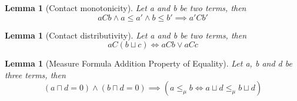 \documentclass{article}
\newtheorem{lemma}[theorem]{Lemma}
\begin{document}
\begin{lemma}[Contact monotonicity]
	Let a and b be two terms, then
	\begin{equation*}
		aCb \land a \leq a' \land b \le b' \implies a'Cb'
	\end{equation*}
\end{lemma}

\begin{lemma}[Contact distributivity]
	Let a and b be two terms, then
	\begin{equation*}
		aC(b \sqcup c) \iff aCb \lor aCc
	\end{equation*}
\end{lemma}

\begin{lemma}[Measure Formula Addition Property of Equality]
	Let a, b and d be three terms, then
	\begin{equation*}
		(a \sqcap d = 0) \land (b \sqcap d = 0) \implies (a \le_\mu b \iff a \sqcup d \le_\mu b \sqcup d)
	\end{equation*}
\end{lemma}
\end{document}
